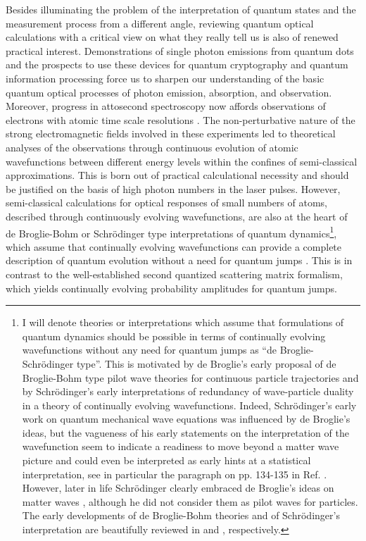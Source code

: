 \documentclass[final,3p,12pt]{elsarticle3}
\begin{document}
Besides illuminating the problem of the interpretation of quantum states and 
the measurement process from a different angle, reviewing quantum optical 
calculations with a critical view on what they really tell us is also of 
renewed practical interest. Demonstrations of single photon emissions from 
quantum dots \cite{1pem1,1pem2,1pem3} and the prospects to use these 
devices for quantum cryptography and quantum information processing force us 
to sharpen our understanding of the basic quantum optical processes of photon 
emission, absorption, and observation. Moreover, progress in attosecond 
spectroscopy \cite{atto1,atto2} now affords observations of electrons with 
atomic time scale resolutions \cite{atom1,atom2,atom3,atom4,atom5}.
The non-perturbative nature of the strong electromagnetic fields involved in
these experiments led to theoretical analyses of the observations through 
continuous evolution of atomic wavefunctions between different energy levels
within the confines of semi-classical approximations. This is born out of
practical calculational necessity and should be justified on the basis of high 
photon numbers in the laser pulses. However, semi-classical calculations for
optical responses of small numbers of atoms, described through continuously
evolving wavefunctions, are also at the heart of de Broglie-Bohm or 
Schr\"odinger type interpretations of quantum dynamics\footnote{I will denote 
theories or interpretations which assume that formulations of quantum dynamics 
should be possible in terms of continually evolving wavefunctions without any 
need for quantum jumps as ``de Broglie-Schr\"odinger type''. This is motivated 
by de Broglie's early proposal of de Broglie-Bohm type pilot wave theories for 
continuous particle trajectories and by Schr\"odinger's early interpretations 
of redundancy of wave-particle duality in a theory of continually evolving 
wavefunctions. Indeed, Schr\"odinger's early work on quantum mechanical wave 
equations was influenced by de Broglie's ideas, but the vagueness of his early 
statements on the interpretation of the wavefunction seem to indicate a readiness 
to move beyond a matter wave picture and could even be interpreted as early hints 
at a statistical interpretation, see in particular the paragraph on pp. 134-135 
in Ref. \cite{erwin}. However, later in life Schr\"odinger clearly embraced de 
Broglie's ideas on matter waves \cite{erwin2,erwin3}, although he 
did not consider them as pilot waves for particles. The early developments of 
de Broglie-Bohm theories and of Schr\"odinger's interpretation are beautifully 
reviewed in \cite{Holland} and \cite{perovic}, respectively.}, which assume that 
continually evolving wavefunctions can provide a complete description of quantum 
evolution without a need for quantum jumps \cite{erwin2,erwin3}. 
This is in contrast to the well-established second quantized scattering 
matrix formalism, which yields continually evolving probability amplitudes for 
quantum jumps.
\end{document}
